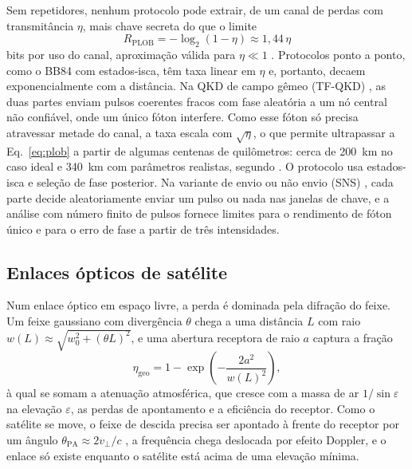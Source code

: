 \documentclass[12pt]{article}
\providecommand{\citeasnoun}[1]{\cite{#1}}
\begin{document}
Sem repetidores, nenhum protocolo pode extrair, de um canal de perdas com
transmitância $\eta$, mais chave secreta do que o limite
\begin{equation}
R_{\mathrm{PLOB}} = -\log_2(1-\eta)\approx1{,}44\,\eta
\label{eq:plob}
\end{equation}
bits por uso do canal, aproximação válida para $\eta\ll1$ \cite{pirandola2017}.
Protocolos ponto a ponto, como o BB84 com estados-isca, têm taxa linear em
$\eta$ e, portanto, decaem exponencialmente com a distância. Na QKD de campo
gêmeo (TF-QKD) \cite{lucamarini2018}, as duas partes enviam pulsos coerentes
fracos com fase aleatória a um nó central não confiável, onde um único fóton
interfere. Como esse fóton só precisa atravessar metade do canal, a taxa escala
com $\sqrt{\eta}$, o que permite ultrapassar a Eq.~\ref{eq:plob} a partir de
algumas centenas de quilômetros: cerca de 200~km no caso ideal e 340~km com
parâmetros realistas, segundo \citeasnoun{lucamarini2018}. O protocolo usa
estados-isca e seleção de fase posterior. Na variante de envio ou não envio
(SNS) \cite{wang2018sns}, cada parte decide aleatoriamente enviar um pulso ou
nada nas janelas de chave, e a análise com número finito de pulsos
\cite{jiang2019} fornece limites para o rendimento de fóton único e para o erro
de fase a partir de três intensidades.

\subsection{Enlaces ópticos de satélite}
\label{sec:fund_sat}

Num enlace óptico em espaço livre, a perda é dominada pela difração do feixe.
Um feixe gaussiano com divergência $\theta$ chega a uma distância $L$ com raio
$w(L)\approx\sqrt{w_0^2+(\theta L)^2}$, e uma abertura receptora de raio $a$
captura a fração
\begin{equation}
\eta_{\mathrm{geo}} = 1-\exp\!\left(-\frac{2a^2}{w(L)^2}\right),
\label{eq:geo}
\end{equation}
à qual se somam a atenuação atmosférica, que cresce com a massa de ar
$1/\sin\varepsilon$ na elevação $\varepsilon$, as perdas de apontamento e a
eficiência do receptor. Como o satélite se move, o feixe de descida precisa ser
apontado à frente do receptor por um ângulo $\theta_{\mathrm{PA}}\approx2v_\perp/c$
\cite{han2018}, a frequência chega deslocada por efeito Doppler, e o enlace só
existe enquanto o satélite está acima de uma elevação mínima.
\end{document}
